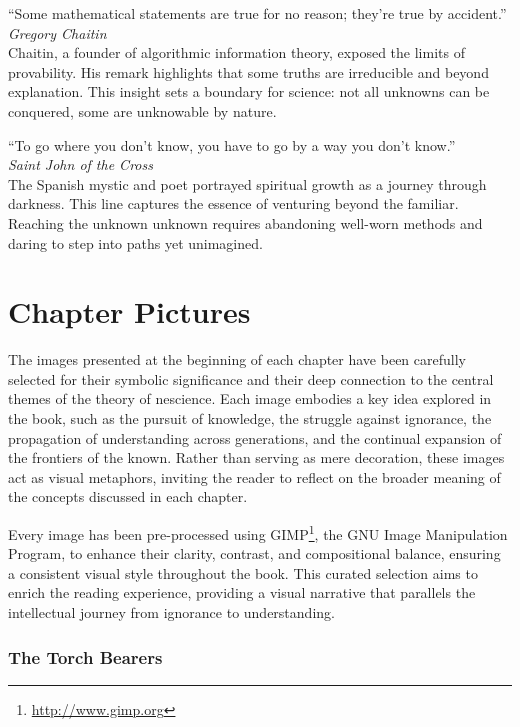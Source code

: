 \noindent
\textquotedblleft Some mathematical statements are true for no reason; they're true by accident.\textquotedblright \\
\emph{Gregory Chaitin} \\
Chaitin, a founder of algorithmic information theory, exposed the limits of provability. His remark highlights that some truths are irreducible and beyond explanation. This insight sets a boundary for science: not all unknowns can be conquered, some are unknowable by nature.

\vspace{1em}

\noindent
\textquotedblleft To go where you don't know, you have to go by a way you don't know.\textquotedblright \\
\emph{Saint John of the Cross} \\
The Spanish mystic and poet portrayed spiritual growth as a journey through darkness. This line captures the essence of venturing beyond the familiar. Reaching the unknown unknown requires abandoning well-worn methods and daring to step into paths yet unimagined.

%
%

\section{Chapter Pictures}

The images presented at the beginning of each chapter have been carefully selected for their symbolic significance and their deep connection to the central themes of the theory of nescience. Each image embodies a key idea explored in the book, such as the pursuit of knowledge, the struggle against ignorance, the propagation of understanding across generations, and the continual expansion of the frontiers of the known. Rather than serving as mere decoration, these images act as visual metaphors, inviting the reader to reflect on the broader meaning of the concepts discussed in each chapter.

Every image has been pre-processed using GIMP\footnote{\url{http://www.gimp.org}}, the GNU Image Manipulation Program, to enhance their clarity, contrast, and compositional balance, ensuring a consistent visual style throughout the book. This curated selection aims to enrich the reading experience, providing a visual narrative that parallels the intellectual journey from ignorance to understanding.

\subsubsection* {The Torch Bearers}

